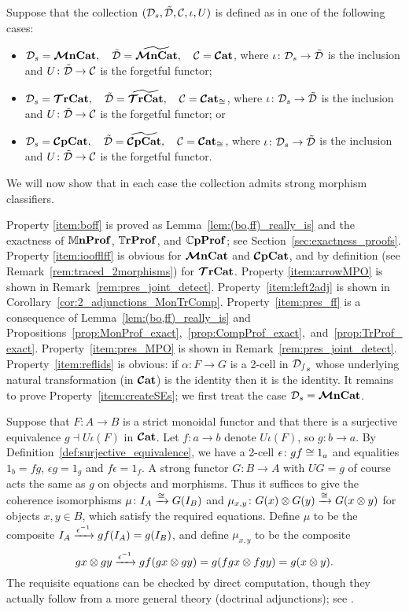 \documentclass[11pt,oneside,article]{memoir}
\begin{document}
\begin{example}
      \label{ex:strictifiable}
Suppose that the collection $(\mathcal{D}_s,\tilde{\mathcal{D}},\mathcal{C},\iota,U)$ is defined as in one of the
following cases:
\begin{itemize}
   \item $\mathcal{D}_s=\bm{\mathcal{M}}\mathbf{nCat}, \quad \tilde{\mathcal{D}}=\widetilde{\bm{\mathcal{M}}\mathbf{nCat}}, \quad \mathcal{C}=\bm{\mathcal{C}}\mathbf{at}$, where
      $\iota\colon\mathcal{D}_s\to\tilde{\mathcal{D}}$ is the inclusion and $U\colon\tilde{\mathcal{D}}\to\mathcal{C}$ is the
      forgetful functor;
   \item $\mathcal{D}_s=\bm{\mathcal{T}}\mathbf{rCat}, \quad \tilde{\mathcal{D}}=\widetilde{\bm{\mathcal{T}}\mathbf{rCat}}, \quad \mathcal{C}=\bm{\mathcal{C}}\mathbf{at}_{\cong}$, where
      $\iota\colon\mathcal{D}_s\to\tilde{\mathcal{D}}$ is the inclusion and $U\colon\tilde{\mathcal{D}}\to\mathcal{C}$ is the
      forgetful functor; or
   \item $\mathcal{D}_s=\bm{\mathcal{C}}\mathbf{pCat}, \quad \tilde{\mathcal{D}}=\widetilde{\bm{\mathcal{C}}\mathbf{pCat}}, \quad \mathcal{C}=\bm{\mathcal{C}}\mathbf{at}_{\cong}$, where
      $\iota\colon\mathcal{D}_s\to\tilde{\mathcal{D}}$ is the inclusion and $U\colon\tilde{\mathcal{D}}\to\mathcal{C}$ is the
      forgetful functor.
\end{itemize}
We will now show that in each case the collection admits strong morphism classifiers.

Property \ref{item:boff} is proved as Lemma~\ref{lem:(bo,ff)_really_is} and the exactness of
$\mathbb{M}\mathbf{nProf}$, $\mathbb{T}\mathbf{rProf}$, and $\mathbb{C}\mathbf{pProf}$; see Section~\ref{sec:exactness_proofs}. Property
\ref{item:ioofflff} is obvious for $\bm{\mathcal{M}}\mathbf{nCat}$ and $\bm{\mathcal{C}}\mathbf{pCat}$, and by definition (see
Remark~\ref{rem:traced_2morphisms}) for $\bm{\mathcal{T}}\mathbf{rCat}$. Property \ref{item:arrowMPO} is shown in
Remark~\ref{rem:pres_joint_detect}. Property~\ref{item:left2adj} is shown in
Corollary~\ref{cor:2_adjunctions_MonTrComp}. Property~\ref{item:pres_ff} is a consequence of Lemma~\ref{lem:(bo,ff)_really_is} and Propositions~\ref{prop:MonProf_exact},~\ref{prop:CompProf_exact},~and~\ref{prop:TrProf_exact}. Property~\ref{item:pres_MPO} is shown in
Remark~\ref{rem:pres_joint_detect}. Property~\ref{item:reflids} is obvious: if $\alpha\colon F\to G$
is a 2-cell in $\mathcal{D_s}_s$ whose underlying natural transformation (in $\bm{\mathcal{C}}\mathbf{at}$) is the identity
then it is the identity. It remains to prove Property~\ref{item:createSEs}; we first treat the case
$\mathcal{D}_s=\bm{\mathcal{M}}\mathbf{nCat}$.

Suppose that $F\colon A\to B$ is a strict monoidal functor and that there is a surjective
equivalence $g\dashv U\iota(F)$ in $\bm{\mathcal{C}}\mathbf{at}$. Let $f\colon a\to b$ denote $U\iota(F)$, so $g\colon
b\to a$. By Definition~\ref{def:surjective_equivalence}, we have a 2-cell $\epsilon\colon gf\cong
1_a$ and equalities $1_b=fg$, $\epsilon g=1_g$ and $f\epsilon=1_f$. A strong functor $G\colon B\to
A$ with $UG=g$ of course acts the same as $g$ on objects and morphisms. Thus it suffices to give the
coherence isomorphisms $\mu\colon I_A\xrightarrow{\cong}G(I_B)$ and $\mu_{x,y}\colon G(x)\otimes
G(y)\xrightarrow{\cong} G(x\otimes y)$ for objects $x,y\in B$, which satisfy the required equations. Define
$\mu$ to be the composite $I_A\xrightarrow{\epsilon^{-1}}gf(I_A)=g(I_B)$, and define $\mu_{x,y}$ to be the
composite
\[
   gx\otimes gy\xrightarrow{\epsilon^{-1}}gf(gx\otimes gy)=g(fgx\otimes fgy)=g(x\otimes y).
\]
The requisite equations can be checked by direct computation, though they actually follow from a
more general theory (doctrinal adjunctions); see \cite{Kelly}.


\end{example}
\end{document}
